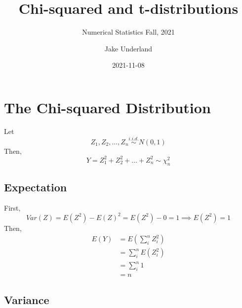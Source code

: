 \documentclass[
]{article}
\title{Chi-squared and t-distributions}
\subtitle{Numerical Statistics Fall, 2021}
\author{Jake Underland}
\date{2021-11-08}
\begin{document}
\maketitle

{
\setcounter{tocdepth}{3}
\tableofcontents
}
\hypertarget{the-chi-squared-distribution}{%
\section{The Chi-squared
Distribution}\label{the-chi-squared-distribution}}

Let \[Z_1, Z_2, \dots, Z_n \stackrel{i.i.d.}{\sim}N(0, 1)\] Then,
\[Y = Z_1^2 + Z_2^2 + \dots + Z_n^2 \sim \chi_n^2\]

\hypertarget{expectation}{%
\subsection{Expectation}\label{expectation}}

First, \[Var(Z) = E(Z^2) - E(Z)^2 = E(Z^2) - 0 = 1\implies E(Z^2) = 1\]
Then, \[\begin{aligned}
E(Y) &= E(\sum_i^n Z_i^2) \\
&= \sum_i^n E(Z_i^2) \\
&= \sum_i^n 1 \\
&= n
\end{aligned}\]

\hypertarget{variance}{%
\subsection{Variance}\label{variance}}
\end{document}
